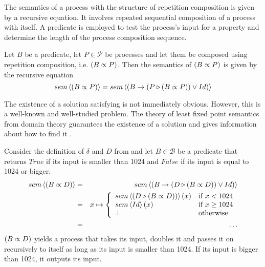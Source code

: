 The semantics of a process with the structure of repetition composition is given by a recursive equation. It involves repeated sequential composition of a process with itself. A predicate is employed to test the process's input for a property and determine the length of the process composition sequence.
\begin{definition}
\label{def:sem_repetition}
Let $B$ be a predicate, let $P \in \mathcal{P}$ be processes and let them be composed using repetition composition, i.e. $\left( B \propto P \right)$. Then the semantics of $\left( B \propto P \right)$ is given by the recursive equation
  \begin{equation*}
    \label{eqn_sem_repetition}
    sem \left\langle \left( B \propto P \right) \right\rangle = sem \left\langle \left( B \to \left( P \triangleright \left( B \propto P \right) \right) \vee Id \right) \right\rangle
  \end{equation*}
  \hfill\qedsymbol
\end{definition}

The existence of a solution satisfying  is not immediately obvious. However, this is a well-known and well-studied problem. The theory of least fixed point semantics from domain theory guarantees the existence of a solution and gives information about how to find it \cite{DenSem}.

\begin{example}
\label{exp:sem_repetition}
Consider the definition of $\delta$ and $D$ from  and let $B \in \mathcal{B}$ be a predicate that returns $True$ if its input is smaller than 1024 and $False$ if its input is equal to 1024 or bigger.
  \begin{eqnarray*}
    sem \left\langle \left( B \propto D \right) \right\rangle & = & sem \left\langle \left( B \to \left( D \triangleright \left( B \propto D \right) \right) \vee Id \right) \right\rangle \\
                            & = & x \mapsto \left\{ \begin{array}{ll} 
                                                      sem \left\langle \left( D \triangleright \left( B \propto D \right) \right) \right\rangle \left( x \right) & \text{if } x < 1024 \\
                                                      sem \left\langle Id \right\rangle \left( x \right)                              & \text{if } x \geq 1024 \\
                                                      \bot                                                   & \text{otherwise}
                                                    \end{array}
                                            \right. \\
                            & = & \ldots
  \end{eqnarray*}
$\left( B \propto D \right)$ yields a process that takes its input, doubles it and passes it on recursively to itself as long as its input is smaller than 1024. If its input is bigger than 1024, it outputs its input.
\end{example}



